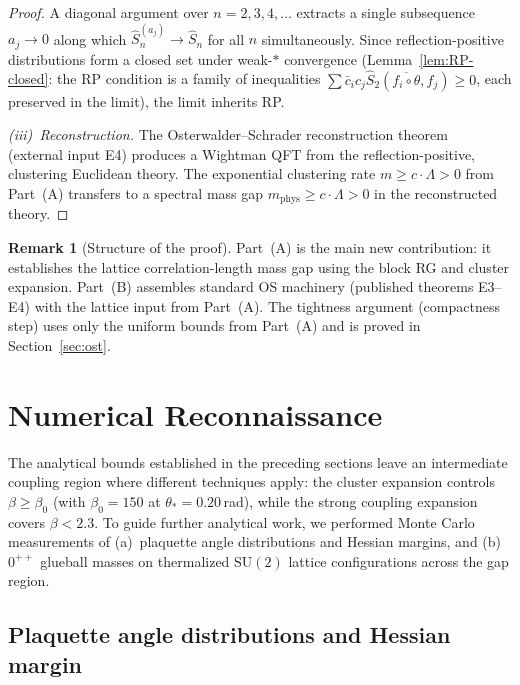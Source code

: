 \documentclass[11pt]{article}
\theoremstyle{definition}
\newtheorem{remark}[theorem]{Remark}
\newcommand{\SU}{\mathrm{SU}}
\begin{document}
\begin{proof}
A diagonal argument over $n=2,3,4,\ldots$ extracts a
single subsequence $a_j\to 0$ along which
$\hat S_n^{(a_j)}\to\hat S_n$ for all $n$ simultaneously.
Since reflection-positive distributions form a closed set
under weak-$*$ convergence (Lemma~\ref{lem:RP-closed}:
the RP condition is a family of inequalities
$\sum\bar c_i c_j\hat S_2(\overline{f_i\circ\theta},f_j)\ge 0$,
each preserved in the limit), the limit inherits RP.

\emph{(iii)~Reconstruction.}
The Osterwalder--Schrader reconstruction theorem~\cite{OS73}
(external input E4) produces a Wightman QFT from the
reflection-positive, clustering Euclidean theory.
The exponential clustering rate $m\ge c\cdot\Lambda>0$
from Part~(A) transfers to a spectral mass gap
$m_{\mathrm{phys}}\ge c\cdot\Lambda>0$ in the
reconstructed theory.
\end{proof}

\begin{remark}[Structure of the proof]%
\label{rem:proof-structure}
Part~(A) is the main new contribution: it establishes the
lattice correlation-length mass gap using the block RG and
cluster expansion.  Part~(B) assembles standard OS machinery
(published theorems E3--E4) with the lattice input from
Part~(A).  The tightness argument (compactness step) uses
only the uniform bounds from Part~(A) and is proved in
Section~\ref{sec:ost}.
\end{remark}

\section{Numerical Reconnaissance}\label{sec:numerical}

The analytical bounds established in the preceding sections leave an
intermediate coupling region where different techniques apply: the
cluster expansion controls $\beta\ge\beta_0$ (with
$\beta_0=150$ at $\theta_*=0.20$\,rad), while the strong coupling
expansion covers $\beta<2.3$.  To guide further analytical
work, we performed Monte Carlo measurements of
(a)~plaquette angle distributions and Hessian margins, and
(b)~$0^{++}$ glueball masses on thermalized $\SU(2)$ lattice
configurations across the gap region.

\subsection{Plaquette angle distributions and Hessian margin}
\end{document}
